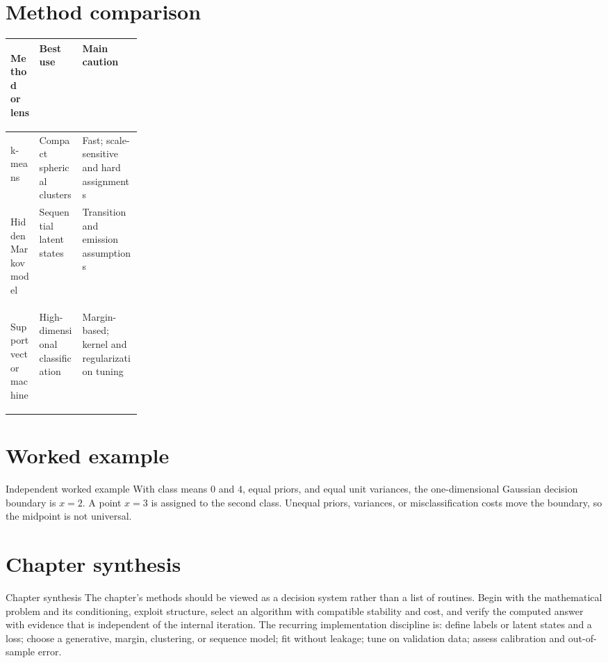 \documentclass[10pt,letterpaper]{article}
\begin{document}
\section*{Method comparison}
\begin{center}
\small
\begin{tabularx}{\linewidth}{>{\bfseries\raggedright\arraybackslash}p{0.22\linewidth}XX}
\toprule
Method or lens & Best use & Main caution \\
\midrule
k-means & Compact spherical clusters & Fast; scale-sensitive and hard assignments \\
Hidden Markov model & Sequential latent states & Transition and emission assumptions \\
Support vector machine & High-dimensional classification & Margin-based; kernel and regularization tuning \\
\bottomrule
\end{tabularx}
\end{center}

\section*{Worked example}
\begin{exambox}{Independent worked example}
With class means $0$ and $4$, equal priors, and equal unit variances, the one-dimensional Gaussian decision boundary is $x=2$.  A point $x=3$ is assigned to the second class.  Unequal priors, variances, or misclassification costs move the boundary, so the midpoint is not universal.
\end{exambox}

\section*{Chapter synthesis}
\begin{summarybox}{Chapter synthesis}
The chapter's methods should be viewed as a decision system rather than a list of routines.  Begin with the mathematical problem and its conditioning, exploit structure, select an algorithm with compatible stability and cost, and verify the computed answer with evidence that is independent of the internal iteration.  The recurring implementation discipline is: define labels or latent states and a loss; choose a generative, margin, clustering, or sequence model; fit without leakage; tune on validation data; assess calibration and out-of-sample error.
\end{summarybox}
\end{document}
